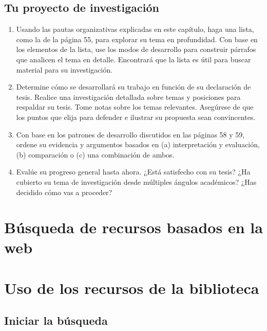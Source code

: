 \section{Tu proyecto de investigación}
\begin{enumerate}[1.]
    \item  Usando las pautas organizativas explicadas en este capítulo, haga una lista, como la de la página 55, para explorar su tema en profundidad. Con base en los elementos de la lista, use los modos de desarrollo para construir párrafos que analicen el tema en detalle. Encontrará que la lista es útil para buscar material para su investigación. 
    \item Determine cómo se desarrollará su trabajo en función de su declaración de tesis. Realice una investigación detallada sobre temas y posiciones para respaldar su tesis. Tome notas sobre los temas relevantes. Asegúrese de que los puntos que elija para defender e ilustrar su propuesta sean convincentes. 
    \item Con base en los patrones de desarrollo discutidos en las páginas 58 y 59, ordene su evidencia y argumentos basados en (a) interpretación y evaluación, (b) comparación o (c) una combinación de ambos. 
    \item Evalúe su progreso general hasta ahora. ¿Está satisfecho con su tesis? ¿Ha cubierto su tema de investigación desde múltiples ángulos académicos? ¿Has decidido cómo vas a proceder?
\end{enumerate}

\chapter{Búsqueda de recursos basados en la web}


\chapter{Uso de los recursos de la biblioteca}

\section{Iniciar la búsqueda}
